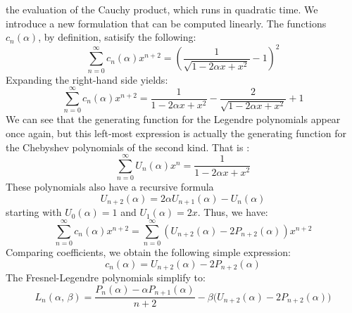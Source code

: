 \documentclass{article}
\theoremstyle{plain}
\begin{document}
        the evaluation of the Cauchy product, which runs in quadratic time.
        We introduce a new formulation that can be computed linearly. The
        functions $c_{n}(\alpha)$, by definition, satisify the following:
        \begin{equation}
            \sum_{n=0}^{\infty}c_{n}(\alpha)x^{n+2}
            =\left(
                \frac{1}{\sqrt{1-2\alpha{x}+x^{2}}}-1
            \right)^{2}
        \end{equation}
        Expanding the right-hand side yields:
        \begin{equation}
            \sum_{n=0}^{\infty}c_{n}(\alpha)x^{n+2}
            =\frac{1}{1-2\alpha{x}+x^{2}}
            -\frac{2}{\sqrt{1-2\alpha{x}+x^{2}}}
            +1
        \end{equation}
        We can see that the generating function for the Legendre polynomials
        appear once again, but this left-most expression is actually the
        generating function for the Chebyshev polynomials of the second kind.
        That is \cite[Tab.~12.1]{ArfkenWeberMathematicalPhysics}:
        \begin{equation}
            \sum_{n=0}^{\infty}U_{n}(\alpha)x^{n}
            =\frac{1}{1-2\alpha{x}+x^{2}}
        \end{equation}
        These polynomials also have a recursive formula
        \cite[Eqn.~1.6a]{MasonHandscombChebyshevPolynomials}
        \begin{equation}
            U_{n+2}(\alpha)=2\alpha{U}_{n+1}(\alpha)-U_{n}(\alpha)
        \end{equation}
        starting with $U_{0}(\alpha)=1$ and $U_{1}(\alpha)=2x$. Thus, we have:
        \begin{equation}
            \sum_{n=0}^{\infty}c_{n}(\alpha)x^{n+2}
            =\sum_{n=0}^{\infty}\left(
                U_{n+2}(\alpha)-2P_{n+2}(\alpha)
            \right)x^{n+2}
        \end{equation}
        Comparing coefficients, we obtain the following simple expression:
        \begin{equation}
            c_{n}(\alpha)=U_{n+2}(\alpha)-2P_{n+2}(\alpha)
        \end{equation}
        The Fresnel-Legendre polynomials simplify to:
        \begin{equation}
            L_{n}(\alpha,\,\beta)
            =\frac{P_{n}(\alpha)-\alpha{P}_{n+1}(\alpha)}{n+2}
                -\beta\big(U_{n+2}(\alpha)-2P_{n+2}(\alpha)\big)
        \end{equation}
\end{document}
